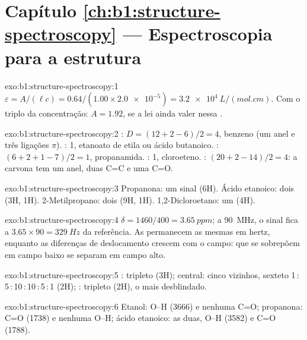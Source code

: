 \section*{Capítulo \ref{ch:b1:structure-spectroscopy} --- Espectroscopia para a estrutura}

\begin{solution}{exo:b1:structure-spectroscopy:1}
$\varepsilon = A/(\ell c) = 0.64/(1.00 \times \num{2.0e-5}) =
\qty{3.2e4}{L/(mol.cm)}$. Com o triplo da concentração: $A = 1.92$, se a
lei ainda valer nessa .
\end{solution}

\begin{solution}{exo:b1:structure-spectroscopy:2}
: $D = (12 + 2 - 6)/2 = 4$, benzeno (um anel e três ligações $\pi$).
: 1, etanoato de etila ou ácido butanoico. : $(6 + 2 + 1
- 7)/2 = 1$, propanamida. : 1, cloroeteno. :
$(20 + 2 - 14)/2 = 4$: a carvona tem um anel, duas C=C e uma C=O.
\end{solution}

\begin{solution}{exo:b1:structure-spectroscopy:3}
Propanona: um sinal (6H). Ácido etanoico: dois (3H, 1H). 2-Metilpropano:
dois (9H, 1H). 1,2-Dicloroetano: um (4H).
\end{solution}

\begin{solution}{exo:b1:structure-spectroscopy:4}
$\delta = 1460/400 = \qty{3.65}{ppm}$; a \qty{90}{MHz}, o sinal fica a
$3.65 \times 90 = \qty{329}{Hz}$ da referência. As  permanecem as mesmas em hertz, enquanto as diferenças de
deslocamento crescem com o campo:  que se sobrepõem em campo
baixo se separam em campo alto.
\end{solution}

\begin{solution}{exo:b1:structure-spectroscopy:5}
: tripleto (3H);  central: cinco vizinhos, sexteto
1\,:\,5\,:\,10\,:\,10\,:\,5\,:\,1 (2H); : tripleto (2H), o mais
desblindado.
\end{solution}

\begin{solution}{exo:b1:structure-spectroscopy:6}
Etanol: O--H (3666) e nenhuma C=O; propanona: C=O (1738) e nenhuma O--H;
ácido etanoico: as duas, O--H (3582) e C=O (1788).
\end{solution}

